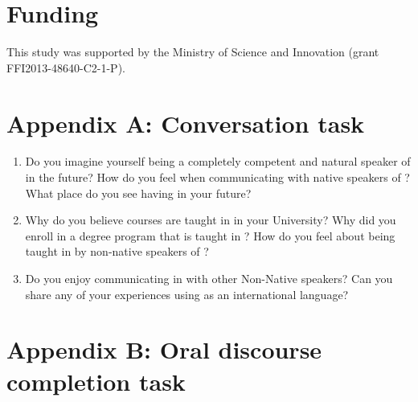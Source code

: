 \documentclass[output=paper]{langsci/langscibook}
\begin{document}
\section*{Funding}

This study was supported by the  Ministry of Science and Innovation (grant FFI2013-48640-C2-1-P). 

\sloppy
\section*{Appendix A: Conversation task}

\begin{enumerate}
\item Do you imagine yourself being a completely competent and natural speaker of  in the future? How do you feel when communicating with native speakers of ? What place do you see  having in your future?
\item Why do you believe courses are taught in  in your University? Why did you enroll in a degree program that is taught in ? How do you feel about being taught in  by non-native speakers of ? 
\item Do you enjoy communicating in  with other Non-Native  speakers? Can you share any of your experiences using  as an international language? 
\end{enumerate}

\section*{Appendix B: Oral discourse completion task}
\end{document}
